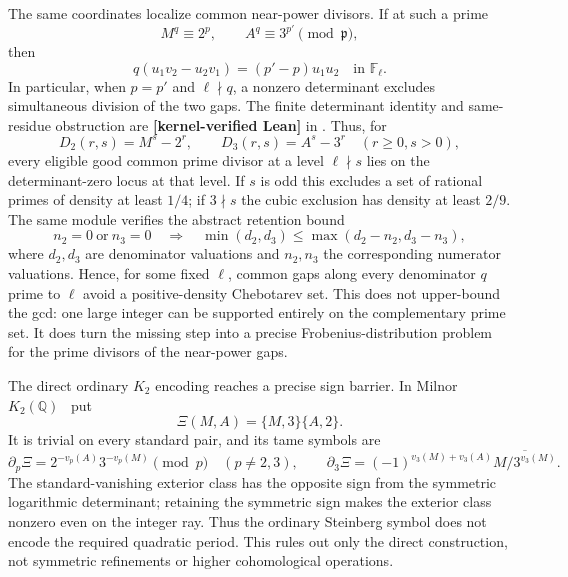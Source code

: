 \documentclass[11pt,oneside]{article}
\theoremstyle{definition}
\theoremstyle{remark}
\newcommand{\Q}{\mathbb Q}
\newcommand{\lean}[1]{\texttt{\detokenize{#1}}}
\newcommand{\statuslean}{\textcolor{leanblue}{\textbf{[kernel-verified Lean]}}}
\begin{document}
The same coordinates localize common near-power divisors.  If at such a prime
\begin{equation}
 M^q\equiv2^p,\qquad A^q\equiv3^{p'}\pmod{\mathfrak p},
 \label{crit:eq-mixed-gap-congruences}
\end{equation}
then
\begin{equation}
 q(u_1v_2-u_2v_1)=(p'-p)u_1u_2\quad\text{in }\mathbb F_\ell.
 \label{crit:eq-mixed-gap-determinant}
\end{equation}
In particular, when $p=p'$ and $\ell\nmid q$, a nonzero determinant excludes simultaneous
division of the two gaps.  The finite determinant identity and same-residue obstruction are
\statuslean{} in \lean{MixedGapKummerFinite}.  Thus, for
\[
 D_2(r,s)=M^s-2^r,\qquad D_3(r,s)=A^s-3^r
 \quad(r\ge0, s>0),
\]
every eligible good common prime divisor at a level $\ell\nmid s$ lies on the
determinant-zero locus at that level.  If $s$ is odd this excludes a set of rational primes of density at least
$1/4$; if $3\nmid s$ the cubic exclusion has density at least $2/9$.
The same module verifies the abstract
retention bound
\[
 n_2=0\ \text{or}\ n_3=0
 \quad\Longrightarrow\quad
 \min(d_2,d_3)\le\max(d_2-n_2,d_3-n_3),
\]
where $d_2,d_3$ are denominator valuations and $n_2,n_3$ the corresponding numerator
valuations.  Hence, for some fixed $\ell$, common gaps
along every denominator $q$ prime to $\ell$ avoid a positive-density Chebotarev set.  This
does not upper-bound the gcd: one large integer can be supported entirely on the complementary
prime set.  It does turn the missing step into a precise Frobenius-distribution problem for
the prime divisors of the near-power gaps.

The direct ordinary $K_2$ encoding reaches a precise sign barrier.  In Milnor
$K_2(\Q)$~\cite{Milnor1971,Weibel2013} put
\begin{equation}
 \Xi(M,A)=\{M,3\}\{A,2\}.
 \label{crit:eq-steinberg-class}
\end{equation}
It is trivial on every standard pair, and its tame symbols are
\begin{equation}
 \partial_p\Xi=2^{-v_p(A)}3^{-v_p(M)}\pmod p\quad(p\ne2,3),
 \qquad
 \partial_3\Xi=(-1)^{v_3(M)+v_3(A)}
 \overline{M/3^{v_3(M)}}.
 \label{crit:eq-steinberg-tame-symbols}
\end{equation}
The standard-vanishing exterior class has the opposite sign from the symmetric logarithmic
determinant; retaining the symmetric sign makes the exterior class nonzero even on the
integer ray.  Thus the ordinary Steinberg symbol does not encode the required quadratic
period.  This rules out only the direct construction, not symmetric refinements or higher
cohomological operations.
\end{document}
